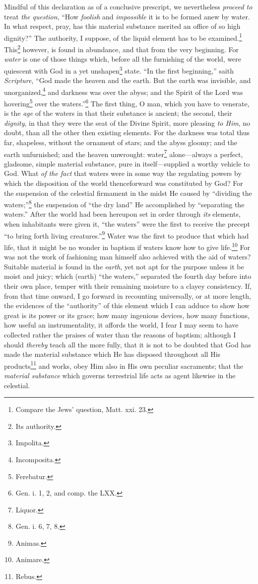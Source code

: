Mindful of this declaration as of a conclusive prescript, we nevertheless \emph{proceed to} treat \emph{the question}, “How \emph{foolish} and \emph{impossible} it is to be formed anew by water. In what respect, pray, has this material substance merited an office of so high dignity?” The authority, I suppose, of the liquid element has to be examined.\footnote{Compare the Jews’ question, Matt. xxi. 23.} This\footnote{Its authority.} however, is found in abundance, and that from the very beginning. For \emph{water} is one of those things which, before all the furnishing of the world, were quiescent with God in a yet unshapen\footnote{Impolita.} state. “In the first beginning,” saith \emph{Scripture}, “God made the heaven and the earth. But the earth was invisible, and unorganized,\footnote{Incomposita.} and darkness was over the abyss; and the Spirit of the Lord was hovering\footnote{Ferebatur.} over the waters.”\footnote{Gen. i. 1, 2, and comp. the LXX.} The first thing, O man, which you have to venerate, is the \emph{age} of the waters in that their substance is ancient; the second, their \emph{dignity}, in that they were the seat of the Divine Spirit, more pleasing \emph{to Him}, no doubt, than all the other then existing elements. For the darkness was total thus far, shapeless, without the ornament of stars; and the abyss gloomy; and the earth unfurnished; and the heaven unwrought: water\footnote{Liquor.} alone—always a perfect, gladsome, simple material substance, pure in itself—supplied a worthy vehicle to God. What \emph{of the fact} that waters were in some way the regulating powers by which the disposition of the world thenceforward was constituted by God? For the suspension of the celestial firmament in the midst He caused by “dividing the waters;”\footnote{Gen. i. 6, 7, 8.} the suspension of “the dry land” He accomplished by “separating the waters.” After the world had been hereupon set in order through \emph{its} elements, when inhabitants were given it, “the waters” were the first to receive the precept “to bring forth living creatures.”\footnote{Animas.} Water was the first to produce that which had life, that it might be no wonder in baptism if waters know how to give life.\footnote{Animare.} For was not the work of fashioning man himself also achieved with the aid of waters? Suitable material is found in the \emph{earth}, yet not apt for the purpose unless it be moist and juicy; which (earth) “the waters,” separated the fourth day before into their own place, temper with their remaining moisture to a clayey consistency. If, from that time onward, I go forward in recounting universally, or at more length, the evidences of the “authority” of this element which I can adduce to show how great is its power or its grace; how many ingenious devices, how many functions, how useful an instrumentality, it affords the world, I fear I may seem to have collected rather the praises of water than the reasons of baptism; although I should \emph{thereby} teach all the more fully, that it is not to be doubted that God has made the material substance which He has disposed throughout all His products\footnote{Rebus.} and works, obey Him also in His own peculiar sacraments; that the \emph{material substance} which governs terrestrial life acts as agent likewise in the celestial.

